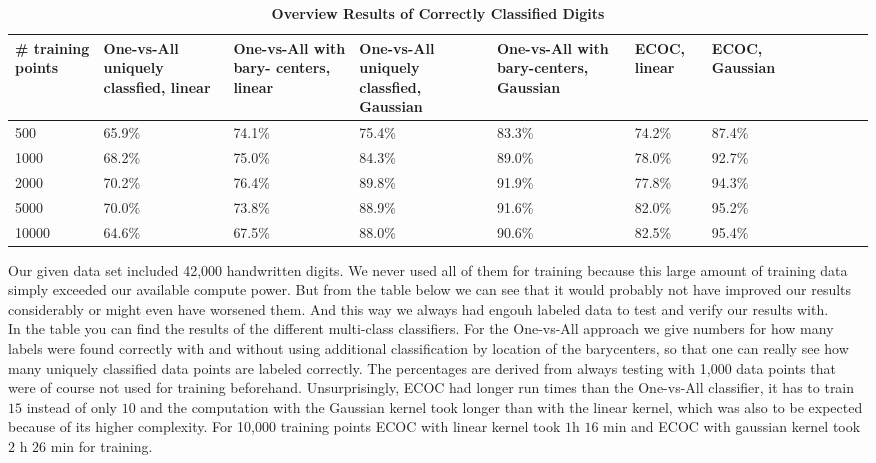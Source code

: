 \begin{table}[ht!]
	\centering
	\caption{\textbf{Overview Results of Correctly Classified Digits}}
	\begin{tabular}{|l|l|l|l|l|l|l|l|l|l|l|l|} \hline
		\multicolumn{1}{|p{1.8cm}|}{\vspace*{.7 cm}\# training points} &
		\multicolumn{1}{p{1.8cm}|}{\vspace*{0 cm}\hbox{One-vs-All} uniquely classfied, linear} &
		\multicolumn{1}{p{1.8cm}|}{\vspace*{0 cm}\hbox{One-vs-All} with bary- centers, linear} &
		\multicolumn{1}{p{1.8cm}|}{\vspace*{0 cm}\hbox{One-vs-All} uniquely classfied, Gaussian} &
		\multicolumn{1}{p{1.8cm}|}{\vspace*{0 cm}\hbox{One-vs-All} with bary-centers, Gaussian} &
		\multicolumn{1}{p{1.8cm}|}{\vspace*{.7 cm}ECOC, \hbox{linear}} &
		\multicolumn{1}{p{1.8cm}|}{\vspace*{.7 cm}ECOC, Gaussian} \\ \hline \hline
		500	& 65.9\% & 74.1\% & 75.4\% & 83.3\% & 74.2\% & 87.4\% \\ \hline
		1000	& 68.2\% & 75.0\% & 84.3\% & 89.0\% & 78.0\% & 92.7\% \\ \hline
		2000	& 70.2\% & 76.4\% & 89.8\% & 91.9\% & 77.8\% & 94.3\% \\ \hline
		5000	& 70.0\% & 73.8\% & 88.9\% & 91.6\% & 82.0\% & 95.2\% \\ \hline
		10000	& 64.6\% & 67.5\% & 88.0\% & 90.6\% & 82.5\% & 95.4\% \\ \hline
	\end{tabular}
\end{table}

\smallskip
Our given data set included 42,000 handwritten digits. We never used all of them for training because this large amount of training data simply exceeded our available compute power. But from the table below we can see that it would probably not have improved our results considerably or might even have worsened them. And this way we always had engouh labeled data to test and verify our results with.\\
In the table you can find the results of the different multi-class classifiers. For the One-vs-All approach we give numbers for how many labels were found correctly with and without using additional classification by location of the barycenters, so that one can really see how many uniquely classified data points are labeled correctly. The percentages are derived from always testing with 1,000 data points that were of course not used for training beforehand. Unsurprisingly, ECOC had longer run times than the One-vs-All classifier, it has to train $15$ instead of only $10$ and the computation with the Gaussian kernel took longer than with the linear kernel, which was also to be expected because of its higher complexity. For 10,000 training points ECOC with linear kernel took $1$h $16$ min and ECOC with gaussian kernel took $2$ h $26$ min for training.  


